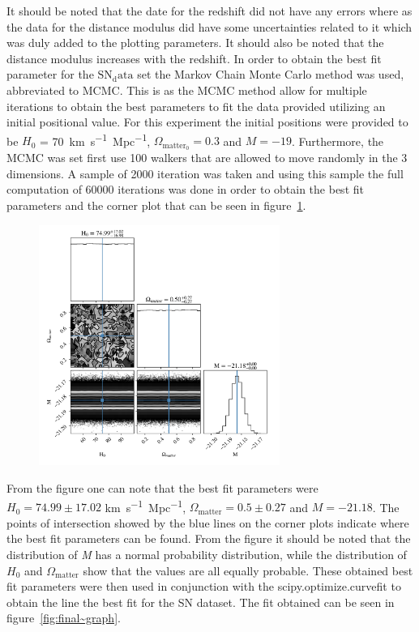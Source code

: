 \documentclass[12pt, a4paper]{article}
\begin{document}
It should be noted that the date for the redshift did not have any errors where as the data for the distance modulus did have some uncertainties related to it which was duly added to the plotting parameters. It should also be noted that the distance modulus increases with the redshift. In order to obtain the best fit parameter for the \(\mathrm{SN_data}\) set the Markov Chain Monte Carlo method was used, abbreviated to MCMC. This is as the MCMC method allow for multiple iterations to obtain the best parameters to fit the data provided utilizing an initial positional value. For this experiment the initial positions were provided to be \(H_0\) = \qty{70}{km.s^{-1}.Mpc^{-1}}, \(\Omega_{\mathrm{matter_0}} = 0.3\) and \(M=-19\). Furthermore, the MCMC was set first use 100 walkers that are allowed to move randomly in the 3 dimensions. A sample of 2000 iteration was taken and using this sample the full computation of 60000 iterations was done in order to obtain the best fit parameters and the corner plot that can be seen in figure~\ref{fig:corner~plots}. 

\begin{figure}[H]
    \centering
    \includegraphics[width = 0.7\textwidth]{Graph 4.png}
    \label{fig:corner~plots}
\end{figure}

From the figure one can note that the best fit parameters were \(H_0 = 74.99 \pm 17.02\) \unit{km.s^{-1}.Mpc^{-1}}, \(\Omega_{\mathrm{matter}} = 0.5 \pm 0.27\) and \(M = -21.18\). The points of intersection showed by the blue lines on the corner plots indicate where the best fit parameters can be found. From the figure it should be noted that the distribution of \textit{M} has a normal probability distribution, while the distribution of \(H_0\) and \(\Omega_{\mathrm{matter}}\) show that the values are all equally probable. These obtained best fit parameters were then used in conjunction with the scipy.optimize.curvefit to obtain the line the best fit for the SN dataset. The fit obtained can be seen in figure~\ref{fig:final~graph}.
\end{document}
